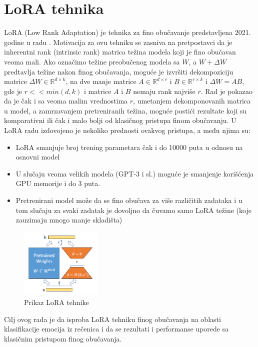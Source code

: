 \documentclass{article}
\theoremstyle{definition}
\begin{document}
	\section{LoRA tehnika} \label{lora}
	LoRA (Low Rank Adaptation) je tehnika za fino obučavanje predstavljena 2021.
	godine u radu \cite{lora}. Motivacija za ovu tehniku se zasniva na 
	pretpostavci da je inherentni rank (intrinsic rank) matrica težina modela 
	koji je fino obučavan veoma mali. Ako označimo težine preobučenog modela sa
	$W$, a $W + \Delta W$ predtavlja težine nakon finog obučavanja, moguće
	je izvršiti dekompoziciju matrice $\Delta W \in \mathbb{R}^{d \times k}$, na 
	dve manje matrice $A \in \mathbb{R}^{d \times r}$ i 
	$B \in \mathbb{R}^{r \times k}$ i $\Delta W = AB$, gde je $r << min(d, k)$ i matrice
	$A$ i $B$ nemaju rank najviše $r$. Rad je pokazao da je
	čak i sa veoma malim vrednostima $r$, umetanjem dekomponovanih matrica
	u model, a zamrzavanjem pretreniranih težina, moguće postići rezultate koji
	su komparativni ili čak i malo bolji od klasičnog pristupa finom obučavanju.
	U LoRA radu izdovojeno je nekoliko prednosti ovakvog pristupa, a među njima su:
	\begin{itemize}
		\item LoRA smanjuje broj trening parametara čak i do 10000 puta u odnosu
		na osnovni model
		\item U slučaju veoma velikih modela (GPT-3 i sl.) moguće je smanjenje
		korišćenja GPU memorije i do 3 puta.
		\item Pretrenirani model može da se fino obučava za više različitih
		zadataka i u tom slučaju za svaki zadatak je dovoljno da čuvamo samo LoRA
		težine (koje zauzimaju mnogo manje skladišta)
	\end{itemize}

	\begin{figure}[h]
		\centering
		\includegraphics[width=0.35\textwidth]{lora}
		\caption{Prikaz LoRA tehnike \label{lora-slika}}
	\end{figure}

	Cilj ovog rada je da isproba LoRA tehniku finog obučavanja na oblasti
	klasifikacije emocija iz rečenica i da se rezultati i performanse uporede
	sa klasičnim pristupom finog obučavanja.
\end{document}
